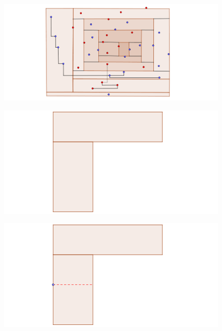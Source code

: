 \documentclass{beamer}
\begin{document}
\begin{frame}
\begin{figure}[h]
\includegraphics[width=\textwidth]{Construccion-poligono-2-alternancia-deco-5}
\end{figure}
\end{frame}
\begin{frame}
\begin{figure}[h]
\includegraphics[width=\textwidth]{Nuestra-construccion}
\end{figure}
\end{frame}
\begin{frame}
\begin{figure}[h]
\includegraphics[width=\textwidth]{Nuestra-construccion-2}
\end{figure}
\end{frame}
\end{document}
